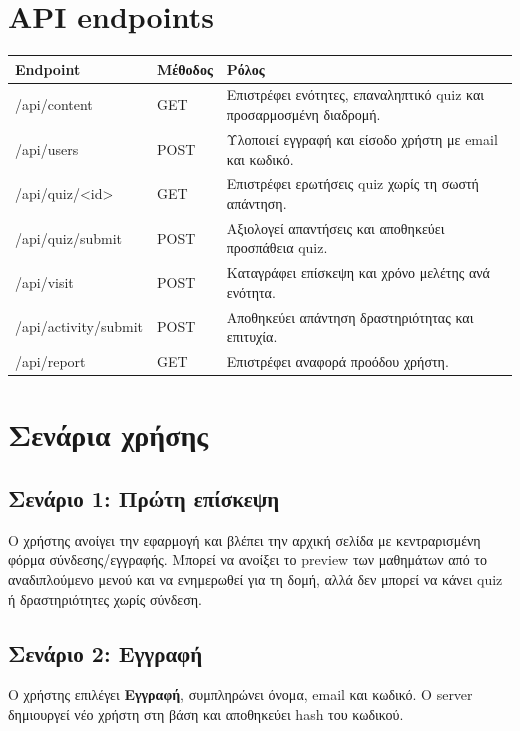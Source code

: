 \documentclass[a4paper]{article}
\newcommand{\textlatin}[1]{\textenglish{#1}}
\begin{document}
\section{API endpoints}

\begin{longtable}{|p{4cm}|p{3cm}|p{7cm}|}
\hline
\textbf{Endpoint} & \textbf{Μέθοδος} & \textbf{Ρόλος} \\
\hline
\textlatin{/api/content} & \textlatin{GET} & Επιστρέφει ενότητες, επαναληπτικό quiz και προσαρμοσμένη διαδρομή. \\
\hline
\textlatin{/api/users} & \textlatin{POST} & Υλοποιεί εγγραφή και είσοδο χρήστη με email και κωδικό. \\
\hline
\textlatin{/api/quiz/<id>} & \textlatin{GET} & Επιστρέφει ερωτήσεις quiz χωρίς τη σωστή απάντηση. \\
\hline
\textlatin{/api/quiz/submit} & \textlatin{POST} & Αξιολογεί απαντήσεις και αποθηκεύει προσπάθεια quiz. \\
\hline
\textlatin{/api/visit} & \textlatin{POST} & Καταγράφει επίσκεψη και χρόνο μελέτης ανά ενότητα. \\
\hline
\textlatin{/api/activity/submit} & \textlatin{POST} & Αποθηκεύει απάντηση δραστηριότητας και επιτυχία. \\
\hline
\textlatin{/api/report} & \textlatin{GET} & Επιστρέφει αναφορά προόδου χρήστη. \\
\hline
\end{longtable}

\section{Σενάρια χρήσης}

\subsection{Σενάριο 1: Πρώτη επίσκεψη}

Ο χρήστης ανοίγει την εφαρμογή και βλέπει την αρχική σελίδα με κεντραρισμένη φόρμα σύνδεσης/εγγραφής. Μπορεί να ανοίξει το preview των μαθημάτων από το αναδιπλούμενο μενού και να ενημερωθεί για τη δομή, αλλά δεν μπορεί να κάνει quiz ή δραστηριότητες χωρίς σύνδεση.

\subsection{Σενάριο 2: Εγγραφή}

Ο χρήστης επιλέγει \textbf{Εγγραφή}, συμπληρώνει όνομα, email και κωδικό. Ο server δημιουργεί νέο χρήστη στη βάση και αποθηκεύει hash του κωδικού.
\end{document}

